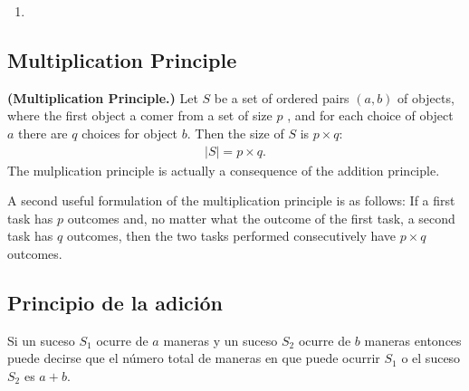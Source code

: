 \begin{example}
    \hspace{0mm}
    \begin{enumerate}
        \item 
    \end{enumerate}
\end{example}

\subsection{Multiplication Principle}

\begin{definition}{\bf (Multiplication Principle.)}
    Let $S$ be a set of ordered pairs $(a,b)$ of objects, where the first object a comer from a set of size $p$
    , and for each choice of object $a$ there are $q$ choices for object $b$. Then the size of $S$ is $p\times q$:
    \begin{align}
        |S| = p\times q.
    \end{align}
    The mulplication principle is actually a consequence of the addition principle.

    A second useful formulation of the multiplication principle is as follows: If a first
    task has $p$ outcomes and, no matter what the outcome of the first task, a second task
    has $q$ outcomes, then the two tasks performed consecutively have $p \times q$ outcomes.
\end{definition}
\subsection{Principio de la adici\'on}
Si un suceso $S_{1}$  ocurre de $a$ maneras y un suceso $S_{2}$ ocurre de $b$ maneras entonces puede decirse que el n\'umero total de maneras en que puede
ocurrir $S_1$ o el suceso $S_2$ es $a+b$.


